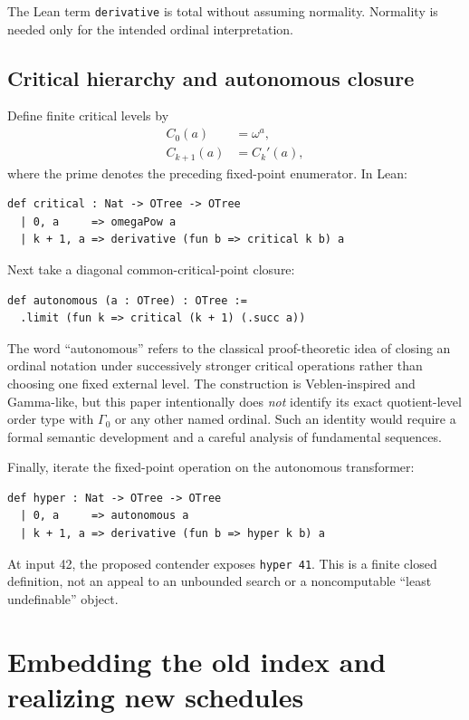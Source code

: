 \documentclass[11pt]{article}
\theoremstyle{definition}
\theoremstyle{remark}
\newcommand{\lean}[1]{\texttt{#1}}
\begin{document}
The Lean term \lean{derivative} is total without assuming normality.  Normality
is needed only for the intended ordinal interpretation.

\subsection{Critical hierarchy and autonomous closure}

Define finite critical levels by
\[
\begin{aligned}
 C_0(a) &= \omega^a,\\
 C_{k+1}(a) &= C_k'(a),
\end{aligned}
\]
where the prime denotes the preceding fixed-point enumerator.  In Lean:
\begin{lstlisting}
def critical : Nat -> OTree -> OTree
  | 0, a     => omegaPow a
  | k + 1, a => derivative (fun b => critical k b) a
\end{lstlisting}

Next take a diagonal common-critical-point closure:
\begin{lstlisting}
def autonomous (a : OTree) : OTree :=
  .limit (fun k => critical (k + 1) (.succ a))
\end{lstlisting}
The word ``autonomous'' refers to the classical proof-theoretic idea of closing
an ordinal notation under successively stronger critical operations rather than
choosing one fixed external level.  The construction is Veblen-inspired and
Gamma-like, but this paper intentionally does \emph{not} identify its exact
quotient-level order type with $\Gamma_0$ or any other named ordinal.  Such an
identity would require a formal semantic development and a careful analysis of
fundamental sequences.

Finally, iterate the fixed-point operation on the autonomous transformer:
\begin{lstlisting}
def hyper : Nat -> OTree -> OTree
  | 0, a     => autonomous a
  | k + 1, a => derivative (fun b => hyper k b) a
\end{lstlisting}
At input 42, the proposed contender exposes \lean{hyper 41}.  This is a finite
closed definition, not an appeal to an unbounded search or a noncomputable
``least undefinable'' object.

\section{Embedding the old index and realizing new schedules}
\end{document}
